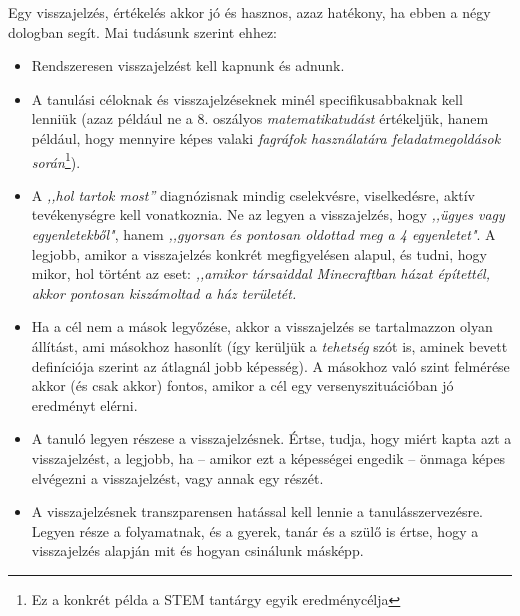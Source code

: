 Egy visszajelzés, értékelés akkor jó és hasznos, azaz hatékony, ha ebben a négy
dologban segít. Mai tudásunk szerint ehhez:
\begin{itemize}
  \item Rendszeresen visszajelzést kell kapnunk és adnunk.
  \item A tanulási céloknak és visszajelzéseknek minél specifikusabbaknak kell
        lenniük (azaz például ne a 8. oszályos \emph{matematikatudást} értékeljük,
        hanem például, hogy mennyire képes valaki \emph{fagráfok használatára
          feladatmegoldások során}\footnote{Ez a konkrét példa a STEM tantárgy egyik
          eredménycélja}).
  \item A \emph{,,hol tartok most''} diagnózisnak mindig cselekvésre,
        viselkedésre, aktív tevékenységre kell vonatkoznia. Ne az legyen a
        visszajelzés, hogy \emph{,,ügyes vagy egyenletekből"}, hanem \emph{,,gyorsan és
          pontosan oldottad meg a 4 egyenletet"}. A legjobb, amikor a visszajelzés
        konkrét megfigyelésen alapul, és tudni, hogy mikor, hol történt az eset:
        \emph{,,amikor társaiddal Minecraftban házat építettél, akkor pontosan
          kiszámoltad a ház területét.}
  \item Ha a cél nem a mások legyőzése, akkor a visszajelzés se tartalmazzon
        olyan állítást, ami másokhoz hasonlít (így kerüljük a \emph{tehetség} szót is,
        aminek bevett definíciója szerint az átlagnál jobb képesség). A másokhoz való
        szint felmérése akkor (és csak akkor) fontos, amikor a cél egy
        versenyszituációban jó eredményt elérni.

  \item A tanuló legyen részese a visszajelzésnek. Értse, tudja, hogy miért kapta
        azt a visszajelzést, a legjobb, ha -- amikor ezt a képességei engedik -- önmaga
        képes elvégezni a visszajelzést, vagy annak egy részét.
  \item A visszajelzésnek transzparensen hatással kell lennie a
        tanulásszervezésre. Legyen része a folyamatnak, és a gyerek, tanár és a szülő
        is értse, hogy a visszajelzés alapján mit és hogyan csinálunk másképp.
\end{itemize}


